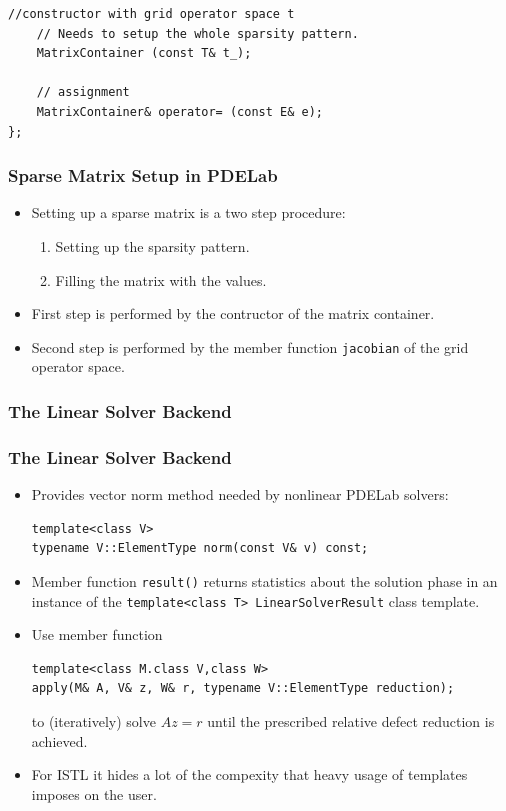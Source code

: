 {\begin{frame}[fragile]
\begin{lstlisting}[basicstyle=\scriptsize]
    //constructor with grid operator space t
    // Needs to setup the whole sparsity pattern.
    MatrixContainer (const T& t_);
      
    // assignment
    MatrixContainer& operator= (const E& e);
};
  \end{lstlisting}
\end{frame}
\begin{frame}[fragile]
  \frametitle{Sparse Matrix Setup in PDELab}
  \begin{itemize}
  \item Setting up a sparse matrix is a two step procedure:
    \begin{enumerate}
    \item Setting up the sparsity pattern.
    \item Filling the matrix with the values.
    \end{enumerate}
  \item First step is performed by the contructor of the matrix
    container.
  \item Second step is performed by the member function
    \lstinline!jacobian! of the grid operator space.
  \end{itemize}

\end{frame}

\subsubsection{The Linear Solver Backend}
\label{sec:line-solv-back}

\begin{frame}[fragile]
  \frametitle<presentation>{The Linear Solver Backend}
  \begin{itemize}
  \item Provides vector norm method needed by nonlinear PDELab solvers:
      \begin{lstlisting}
template<class V>
typename V::ElementType norm(const V& v) const;
      \end{lstlisting}
    \item Member function \lstinline!result()! returns statistics
      about the solution phase in an instance of the
      \lstinline!template<class T> LinearSolverResult! class template.
\item Use member function 
  \begin{lstlisting}
template<class M.class V,class W>
apply(M& A, V& z, W& r, typename V::ElementType reduction);
  \end{lstlisting}
  to (iteratively) solve $Az=r$ until the prescribed relative defect
  reduction is achieved.
  \item For ISTL it hides a lot of the compexity that heavy usage of
    templates imposes on the user.
  \end{itemize}
\end{frame}

}
